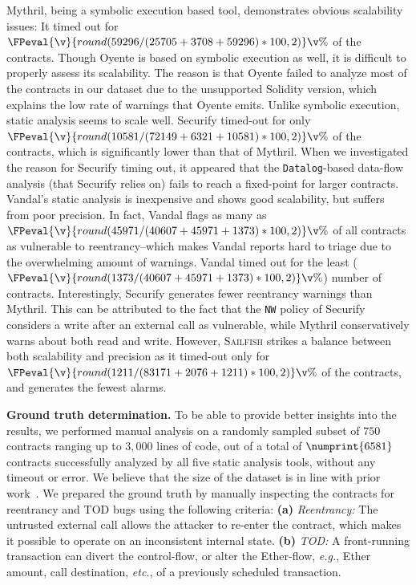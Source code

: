 \documentclass[conference, romanappendices]{tex/IEEEtran}
\theoremstyle{bfnote}
\newcommand{\toolname}{\textsc{Sailfish}\xspace}
\newcommand{\oyente}{{\sc Oyente}\xspace}
\newcommand{\securify}{{\sc Securify}\xspace}
\newcommand{\vandal}{{\sc Vandal}\xspace}
\newcommand{\solidity}{{\sc Solidity}\xspace}
\newcommand{\ether}{{Ether}\xspace}
\newcommand{\reentrancy}{{reentrancy}\xspace}
\newcommand{\mythril}{{\sc Mythril}\xspace}
\newcommand{\etc}{\textit{etc.}}
\newcommand{\eg}{\textit{e.g.}}
\let\num\numprint
\newcommand{\securifySafeDAO}{72149}
\newcommand{\securifyUnsafeDAO}{6321}
\newcommand{\securifyTimeout}{10581}
\newcommand{\mythrilSafeDAO}{25705}
\newcommand{\mythrilUnsafeDAO}{3708}
\newcommand{\mythrilTimeout}{59296}
\newcommand{\vandalSafeDAO}{40607}
\newcommand{\vandalUnsafeDAO}{45971}
\newcommand{\vandalTimeout}{1373}
\newcommand{\clintSafeDAO}{83171}
\newcommand{\clintUnsafeDAO}{2076}
\newcommand{\clintTimeout}{1211}
\newcommand{\manualAnalysisDataset}{750}
\newcommand{\allToolsSuccess}{6581}
\begin{document}
\mythril, being a symbolic execution based tool, demonstrates obvious scalability issues: It timed out for $\FPeval{\v}{round(\mythrilTimeout/(\mythrilSafeDAO+\mythrilUnsafeDAO+\mythrilTimeout)*100,2)}\v\%$ of the contracts.
Though \oyente is based on symbolic execution as well, it is difficult to properly assess its scalability.
The reason is that \oyente failed to analyze most of the contracts in our dataset due to the unsupported \solidity version, which explains the low rate of warnings that \oyente emits.
Unlike symbolic execution, static analysis seems to scale well.
\securify{} timed-out for only $\FPeval{\v}{round(\securifyTimeout/(\securifySafeDAO+\securifyUnsafeDAO+\securifyTimeout)*100,2)}\v\%$ of the contracts, which is significantly lower than that of \mythril.
When we investigated the reason for \securify timing out, it appeared that the \texttt{Datalog}-based data-flow analysis (that \securify relies on) fails to reach a fixed-point for larger contracts.
\vandal's static analysis is inexpensive and shows good scalability, but suffers from poor precision. In fact, \vandal{} flags as many as $\FPeval{\v}{round(\vandalUnsafeDAO/(\vandalSafeDAO+\vandalUnsafeDAO+\vandalTimeout)*100,2)}\v\%$ of all contracts as vulnerable to \reentrancy--which makes \vandal{} reports hard to triage due to the overwhelming amount of warnings.
\vandal{} timed out for the least ($\FPeval{\v}{round(\vandalTimeout/(\vandalSafeDAO+\vandalUnsafeDAO+\vandalTimeout)*100,2)}\v\%$) number of contracts.
Interestingly, \securify{} generates fewer \reentrancy warnings than \mythril.
This can be attributed to the fact that the \texttt{NW} policy of \securify{} considers a write after an external call as vulnerable, while \mythril{} conservatively warns about both read and write.
However, \toolname strikes a balance between both scalability and precision as it timed-out only for $\FPeval{\v}{round(\clintTimeout/(\clintSafeDAO+\clintUnsafeDAO+\clintTimeout)*100,2)}\v\%$ of the contracts, and generates the fewest alarms.


\noindent
\textbf{Ground truth determination.}
\label{subsec:groundtruth}
To be able to provide better insights into the results, we performed manual analysis on a randomly sampled subset of $\manualAnalysisDataset$ contracts ranging up to $3,000$ lines of code, out of a total of $\num{\allToolsSuccess}$ contracts successfully analyzed by all five static analysis tools, without any timeout or error.
We believe that the size of the dataset is in line with prior work~\cite{ethor,zeus}.
We prepared the ground truth by manually inspecting the contracts for \reentrancy and TOD bugs using the following criteria:
\textbf{(a)} \textit{Reentrancy:} The untrusted external call allows the attacker to re-enter the contract, which makes it possible to operate on an inconsistent internal state.
\textbf{(b)} \textit{TOD:} A front-running transaction can divert the control-flow, or alter the \ether-flow, \eg, \ether amount, call destination, \etc, of a previously scheduled transaction.
\end{document}

